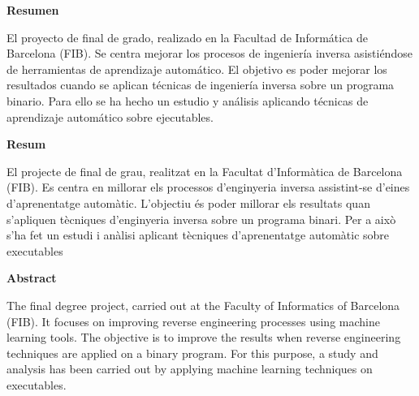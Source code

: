 \cleardoublepage

\noindent
\textbf{\huge Resumen}
\newline

El proyecto de final de grado, realizado en la Facultad de Informática de Barcelona (FIB). Se centra mejorar los procesos de ingeniería inversa asistiéndose
de herramientas de aprendizaje automático. El objetivo es poder mejorar los resultados cuando se aplican técnicas de ingeniería inversa sobre un programa
binario. Para ello se ha hecho un estudio y análisis aplicando técnicas de aprendizaje automático sobre ejecutables. \newline

\noindent
\textbf{\huge Resum}
\newline

El projecte de final de grau, realitzat en la Facultat d'Informàtica de Barcelona (FIB). Es centra en millorar els processos d'enginyeria inversa assistint-se
d'eines d'aprenentatge automàtic. L'objectiu és poder millorar els resultats quan s'apliquen tècniques d'enginyeria inversa sobre un programa
binari. Per a això s'ha fet un estudi i anàlisi aplicant tècniques d'aprenentatge automàtic sobre executables \newline

\noindent
\textbf{\huge Abstract}
\newline

The final degree project, carried out at the Faculty of Informatics of Barcelona (FIB). It focuses on improving reverse engineering processes using
machine learning tools. The objective is to improve the results when reverse engineering techniques are applied on a binary program.
For this purpose, a study and analysis has been carried out by applying machine learning techniques on executables.\newline

